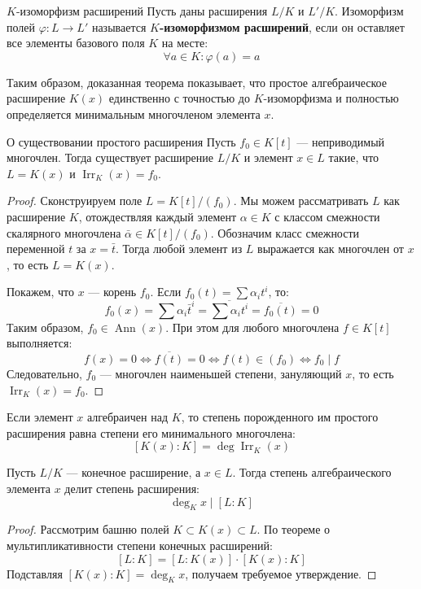 \begin{Definition}{$K$-изоморфизм расширений}{}
	Пусть даны расширения $L/K$ и $L'/K$. Изоморфизм полей $\varphi: L \to L'$ называется \textbf{$K$-изоморфизмом расширений}, если он оставляет все элементы базового поля $K$ на месте:
	\[ \forall a \in K: \varphi(a) = a \]
\end{Definition}

Таким образом, доказанная теорема показывает, что простое алгебраическое расширение $K(x)$ единственно с точностью до $K$-изоморфизма и полностью определяется минимальным многочленом элемента $x$.

\begin{Theorem}{О существовании простого расширения}{}
	Пусть $f_0 \in K[t]$ --- неприводимый многочлен.
	Тогда существует расширение $L/K$ и элемент $x \in L$ такие, что $L = K(x)$ и $\operatorname{Irr}_K(x) = f_0$.
\end{Theorem}

\begin{proof}
	Сконструируем поле $L = K[t]/(f_0)$. Мы можем рассматривать $L$ как расширение $K$, отождествляя каждый элемент $\alpha \in K$ с классом смежности скалярного многочлена $\bar{\alpha} \in K[t]/(f_0)$.
	Обозначим класс смежности переменной $t$ за $x = \bar{t}$. Тогда любой элемент из $L$ выражается как многочлен от $x$, то есть $L = K(x)$.

	Покажем, что $x$ --- корень $f_0$. Если $f_0(t) = \sum \alpha_i t^i$, то:
	\[ f_0(x) = \sum \alpha_i \bar{t}^i = \overline{\sum \alpha_i t^i} = \overline{f_0(t)} = 0 \]
	Таким образом, $f_0 \in \operatorname{Ann}(x)$.
	При этом для любого многочлена $f \in K[t]$ выполняется:
	\[ f(x) = 0 \iff \overline{f(t)} = 0 \iff f(t) \in (f_0) \iff f_0 \mid f \]
	Следовательно, $f_0$ --- многочлен наименьшей степени, зануляющий $x$, то есть $\operatorname{Irr}_K(x) = f_0$.
\end{proof}

\begin{Corollary}{}{}
	Если элемент $x$ алгебраичен над $K$, то степень порожденного им простого расширения равна степени его минимального многочлена:
	\[ [K(x):K] = \deg \operatorname{Irr}_K(x) \]
\end{Corollary}

\begin{Corollary}{}{}
	Пусть $L/K$ --- конечное расширение, а $x \in L$.
	Тогда степень алгебраического элемента $x$ делит степень расширения:
	\[ \deg_K x \mid [L:K] \]
\end{Corollary}

\begin{proof}
	Рассмотрим башню полей $K \subset K(x) \subset L$. По теореме о мультипликативности степени конечных расширений:
	\[ [L:K] = [L:K(x)] \cdot [K(x):K] \]
	Подставляя $[K(x):K] = \deg_K x$, получаем требуемое утверждение.
\end{proof}
